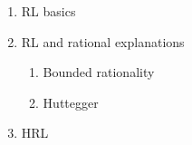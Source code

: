 \begin{enumerate}
	\item RL basics
	\item RL and rational explanations
		\begin{enumerate}
			\item Bounded rationality
			\item Huttegger
		\end{enumerate}
	\item HRL
\end{enumerate}
